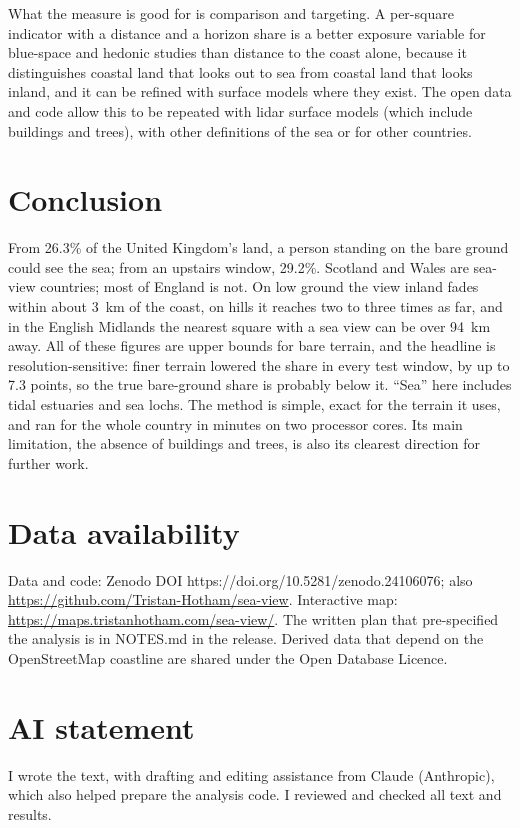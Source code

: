 \documentclass[11pt,a4paper]{article}
\begin{document}
What the measure is good for is comparison and targeting. A per-square indicator with a distance and a horizon share is a better exposure variable for blue-space and hedonic studies than distance to the coast alone, because it distinguishes coastal land that looks out to sea from coastal land that looks inland, and it can be refined with surface models where they exist. The open data and code allow this to be repeated with lidar surface models (which include buildings and trees), with other definitions of the sea or for other countries.

\section{Conclusion}\label{sec:conc}
From 26.3\% of the United Kingdom's land, a person standing on the bare ground could see the sea; from an upstairs window, 29.2\%. Scotland and Wales are sea-view countries; most of England is not. On low ground the view inland fades within about 3~km of the coast, on hills it reaches two to three times as far, and in the English Midlands the nearest square with a sea view can be over 94~km away. All of these figures are upper bounds for bare terrain, and the headline is resolution-sensitive: finer terrain lowered the share in every test window, by up to 7.3 points, so the true bare-ground share is probably below it. ``Sea'' here includes tidal estuaries and sea lochs. The method is simple, exact for the terrain it uses, and ran for the whole country in minutes on two processor cores. Its main limitation, the absence of buildings and trees, is also its clearest direction for further work.

\section*{Data availability}
Data and code: Zenodo DOI https://doi.org/10.5281/zenodo.24106076; also \url{https://github.com/Tristan-Hotham/sea-view}. Interactive map: \url{https://maps.tristanhotham.com/sea-view/}. The written plan that pre-specified the analysis is in NOTES.md in the release. Derived data that depend on the OpenStreetMap coastline are shared under the Open Database Licence.

\section*{AI statement}
I wrote the text, with drafting and editing assistance from Claude (Anthropic), which also helped prepare the analysis code. I reviewed and checked all text and results.
\end{document}
